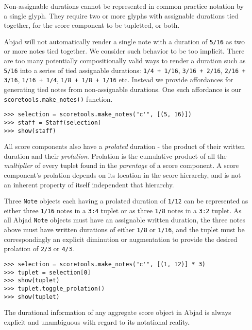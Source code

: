 Non-assignable durations cannot be represented in common practice notation by a
single glyph. They require two or more glyphs with assignable durations tied
together, for the score component to be tupletted, or both.

Abjad will not automatically render a single note with a duration of
\texttt{5/16} as two or more notes tied together. We consider such behavior to
be too implicit. There are too many potentially compositionally valid ways to
render a duration such as \texttt{5/16} into a series of tied assignable
durations: \texttt{1/4 + 1/16}, \texttt{3/16 + 2/16}, \texttt{2/16 + 3/16},
\texttt{1/16 + 1/4}, \texttt{1/8 + 1/8 + 1/16} etc. Instead we provide
affordances for generating tied notes from non-assignable durations. One such
affordance is our \texttt{scoretools.make\_notes()} function.

\begin{lstlisting}
>>> selection = scoretools.make_notes("c'", [(5, 16)])
>>> staff = Staff(selection)
>>> show(staff)\end{lstlisting}

All score components also have a \emph{prolated} duration - the product of
their written duration and their \emph{prolation}. Prolation is the cumulative
product of all the \emph{multiplier} of every tuplet found in the
\emph{parentage} of a score component. A score component's prolation depends on
its location in the score hierarchy, and is not an inherent property of itself
independent that hierarchy.

Three \texttt{Note} objects each having a prolated duration of \texttt{1/12}
can be represented as either three \texttt{1/16} notes in a \texttt{3:4} tuplet
or as three \texttt{1/8} notes in a \texttt{3:2} tuplet. As all Abjad
\texttt{Note} objects must have an assignable written duration, the three notes
above must have written durations of either \texttt{1/8} or \texttt{1/16}, and
the tuplet must be correspondingly an explicit diminution or augmentation to
provide the desired prolation of \texttt{2/3} or \texttt{4/3}.

\begin{lstlisting}
>>> selection = scoretools.make_notes("c'", [(1, 12)] * 3)
>>> tuplet = selection[0]
>>> show(tuplet)
>>> tuplet.toggle_prolation()
>>> show(tuplet)\end{lstlisting}

The durational information of any aggregate score object in Abjad is always
explicit and unambiguous with regard to its notational reality.

